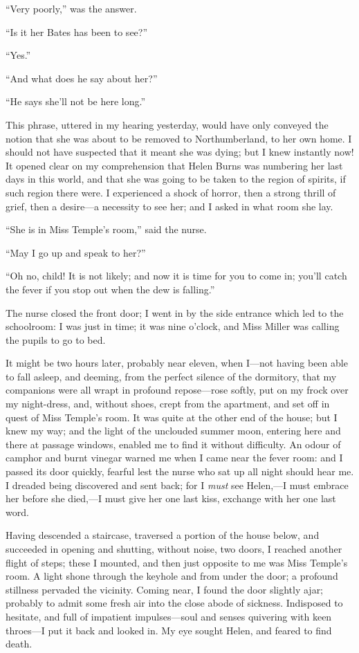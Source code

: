 \enquote{Very poorly,} was the answer.

\enquote{Is it her \Mr{} Bates has been to see?}

\enquote{Yes.}

\enquote{And what does he say about her?}

\enquote{He says she'll not be here long.}

This phrase, uttered in my hearing yesterday, would have only conveyed
the notion that she was about to be removed to Northumberland, to her
own home. I should not have suspected that it meant she was dying; but
I knew instantly now! It opened clear on my comprehension that Helen
Burns was numbering her last days in this world, and that she was going
to be taken to the region of spirits, if such region there were. I
experienced a shock of horror, then a strong thrill of grief, then a
desire---a necessity to see her; and I asked in what room she lay.

\enquote{She is in Miss Temple's room,} said the nurse.

\enquote{May I go up and speak to her?}

\enquote{Oh no, child! It is not likely; and now it is time for you to
	come in; you'll catch the fever if you stop out when the dew is
	falling.}

The nurse closed the front door; I went in by the side entrance which
led to the schoolroom: I was just in time; it was nine o'clock, and Miss
Miller was calling the pupils to go to bed.

It might be two hours later, probably near eleven, when I---not having
been able to fall asleep, and deeming, from the perfect silence of the
dormitory, that my companions were all wrapt in profound repose---rose
softly, put on my frock over my night-dress, and, without shoes, crept
from the apartment, and set off in quest of Miss Temple's room. It was
quite at the other end of the house; but I knew my way; and the light of
the unclouded summer moon, entering here and there at passage windows,
enabled me to find it without difficulty. An odour of camphor and burnt
vinegar warned me when I came near the fever room: and I passed its door
quickly, fearful lest the nurse who sat up all night should hear me. I
dreaded being discovered and sent back; for I \emph{must} see Helen,---I
must embrace her before she died,---I must give her one last kiss,
exchange with her one last word.

Having descended a staircase, traversed a portion of the house below,
and succeeded in opening and shutting, without noise, two doors, I
reached another flight of steps; these I mounted, and then just opposite
to me was Miss Temple's room. A light shone through the keyhole and
from under the door; a profound stillness pervaded the vicinity. Coming
near, I found the door slightly ajar; probably to admit some fresh air
into the close abode of sickness. Indisposed to hesitate, and full of
impatient impulses---soul and senses quivering with keen throes---I put
it back and looked in. My eye sought Helen, and feared to find death.

